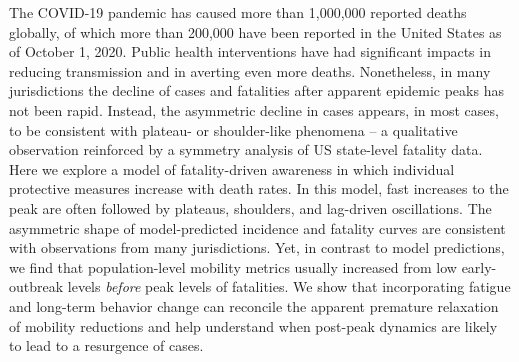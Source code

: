 The COVID-19 pandemic has caused more than 1,000,000 reported deaths globally, of which more than 200,000 have been reported in the United States as of October 1, 2020. 
Public health interventions have had significant impacts in reducing transmission and in averting even more deaths. 
Nonetheless, in many jurisdictions the decline of cases and fatalities after apparent epidemic peaks has not been rapid.  
Instead, the asymmetric decline in cases appears, in most cases, to be consistent with plateau- or shoulder-like phenomena -- a qualitative observation reinforced by a symmetry analysis of US state-level fatality data.  
Here we explore a model of fatality-driven awareness in which individual protective measures increase with death rates.  
In this model, fast increases to the peak are often followed by plateaus, shoulders, and lag-driven oscillations. 
The asymmetric shape of model-predicted incidence and fatality curves are consistent with observations from many jurisdictions. 
Yet, in contrast to model predictions, we find that population-level mobility metrics usually increased from low early-outbreak levels \emph{before} peak levels of fatalities.  
We show that incorporating fatigue and long-term behavior change can reconcile the apparent premature relaxation of mobility reductions and help understand when post-peak dynamics are likely to lead to a resurgence of cases.
